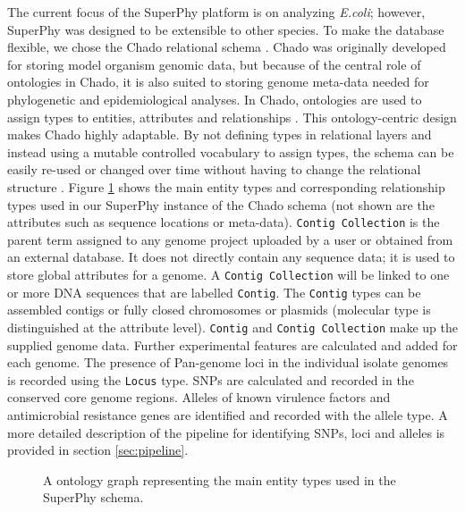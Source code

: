 \documentclass[a4paper,twoside]{article}
\begin{document}
{The current focus of the SuperPhy platform is on analyzing \textit{E.coli}; however, SuperPhy was designed to be extensible to other species. To make the database flexible, we chose the Chado relational schema \cite{mungall2007chado}. Chado was originally developed for storing model organism genomic data, but because of the central role of ontologies in Chado, it is also suited to storing genome meta-data needed for phylogenetic and epidemiological analyses. In Chado, ontologies are used to assign types to entities, attributes and relationships \cite{mungall2007chado}. This ontology-centric design makes Chado highly adaptable. By not defining types in relational layers and instead using a mutable controlled vocabulary to assign types, the schema can be easily re-used or changed over time without having to change the relational structure \cite{mungall2007chado}.  Figure \ref{fig:ontology} shows the main entity types and corresponding relationship types used in our SuperPhy instance of the Chado schema (not shown are the attributes such as sequence locations or  meta-data). \texttt{Contig Collection} is the parent term assigned to any genome project uploaded by a user or obtained from an external database.  It does not directly contain any sequence data; it is used to store global attributes for a genome. A \texttt{Contig Collection} will be linked to one or more DNA sequences that are labelled \texttt{Contig}. The \texttt{Contig} types can be assembled contigs or fully closed chromosomes or plasmids (molecular type is distinguished at the attribute level). \texttt{Contig} and \texttt{Contig Collection} make up the supplied genome data. Further experimental features are calculated and added for each genome. The presence of Pan-genome loci in the individual isolate genomes is recorded using the \texttt{Locus} type. SNPs are calculated and recorded in the conserved core genome regions. Alleles of known virulence factors and antimicrobial resistance genes are identified and recorded with the allele type.  A more detailed description of the pipeline for identifying SNPs, loci and alleles is provided in section \ref{sec:pipeline}.

\begin{figure}[t]
  \vspace{-0.2cm}
  \centering
   {}
  \caption{A ontology graph representing the main entity types used in the SuperPhy schema.}
  \label{fig:ontology}
\end{figure}

}
\end{document}
